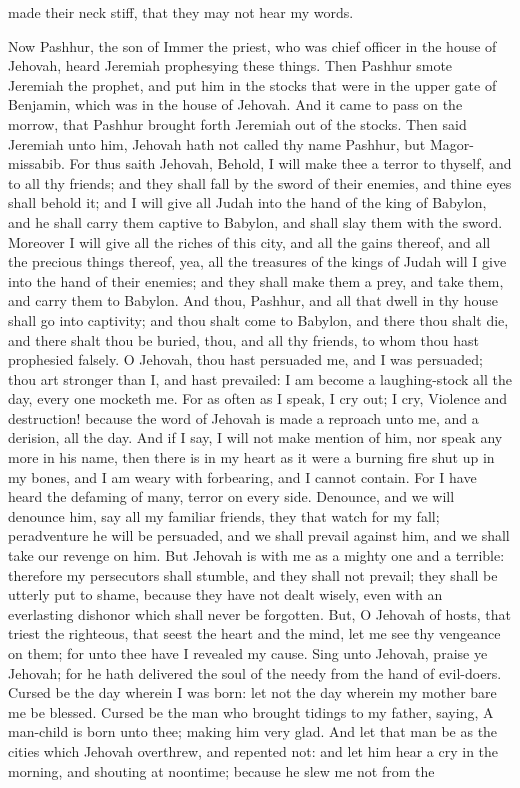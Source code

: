 made their neck stiff, that they may not hear my words. 

Now Pashhur, the son of Immer the priest, who was chief officer in the house of Jehovah, heard Jeremiah prophesying these things. Then Pashhur smote Jeremiah the prophet, and put him in the stocks that were in the upper gate of Benjamin, which was in the house of Jehovah. And it came to pass on the morrow, that Pashhur brought forth Jeremiah out of the stocks. Then said Jeremiah unto him, Jehovah hath not called thy name Pashhur, but Magor-missabib. For thus saith Jehovah, Behold, I will make thee a terror to thyself, and to all thy friends; and they shall fall by the sword of their enemies, and thine eyes shall behold it; and I will give all Judah into the hand of the king of Babylon, and he shall carry them captive to Babylon, and shall slay them with the sword. Moreover I will give all the riches of this city, and all the gains thereof, and all the precious things thereof, yea, all the treasures of the kings of Judah will I give into the hand of their enemies; and they shall make them a prey, and take them, and carry them to Babylon. And thou, Pashhur, and all that dwell in thy house shall go into captivity; and thou shalt come to Babylon, and there thou shalt die, and there shalt thou be buried, thou, and all thy friends, to whom thou hast prophesied falsely.  O Jehovah, thou hast persuaded me, and I was persuaded; thou art stronger than I, and hast prevailed: I am become a laughing-stock all the day, every one mocketh me. For as often as I speak, I cry out; I cry, Violence and destruction! because the word of Jehovah is made a reproach unto me, and a derision, all the day. And if I say, I will not make mention of him, nor speak any more in his name, then there is in my heart as it were a burning fire shut up in my bones, and I am weary with forbearing, and I cannot contain. For I have heard the defaming of many, terror on every side. Denounce, and we will denounce him, say all my familiar friends, they that watch for my fall; peradventure he will be persuaded, and we shall prevail against him, and we shall take our revenge on him. But Jehovah is with me as a mighty one and a terrible: therefore my persecutors shall stumble, and they shall not prevail; they shall be utterly put to shame, because they have not dealt wisely, even with an everlasting dishonor which shall never be forgotten. But, O Jehovah of hosts, that triest the righteous, that seest the heart and the mind, let me see thy vengeance on them; for unto thee have I revealed my cause. Sing unto Jehovah, praise ye Jehovah; for he hath delivered the soul of the needy from the hand of evil-doers.  Cursed be the day wherein I was born: let not the day wherein my mother bare me be blessed. Cursed be the man who brought tidings to my father, saying, A man-child is born unto thee; making him very glad. And let that man be as the cities which Jehovah overthrew, and repented not: and let him hear a cry in the morning, and shouting at noontime; because he slew me not from the 